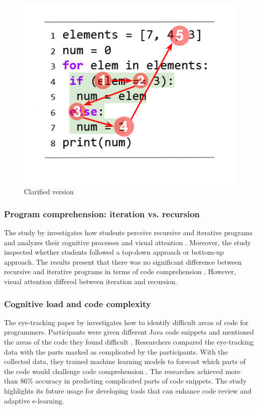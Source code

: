 \begin{figure} [H]
  \centering
  \includegraphics[scale=0.8]{figures/b.png}
  \caption{Clarified version \cite[p. 5]{silva2023evaluating}}
  \label{fig:AnhangsChor}
\end{figure}


\subsubsection{Program comprehension: iteration vs. recursion} 
The study by \citet{aroobaunderstanding} investigates how students perceive recursive and iterative programs and analyzes their cognitive processes and visual attention \citet{aroobaunderstanding}. Moreover, the study inspected whether students followed a top-down approach or bottom-up approach.
The results present that there was no significant difference between recursive and iterative programs in terms of code comprehension \cite{aroobaunderstanding}.  However, visual attention differed between iteration and recursion. 

\subsubsection{Cognitive load and code complexity} 

The eye-tracking paper by \citet{abbad2022estimating} investigates how to identify difficult areas of code for programmers.  Participants were given different Java code snippets and mentioned the areas of the code they found difficult \cite{abbad2022estimating}. Researchers compared the eye-tracking data with the parts marked as complicated by the participants. With the collected data, they trained machine learning models to forecast which parts of the code would challenge code comprehension \cite{abbad2022estimating}. The researches achieved more than 86\% accuracy in predicting complicated parts of code snippets. The study highlights its future usage for developing tools that can enhance code review and adaptive e-learning. 



